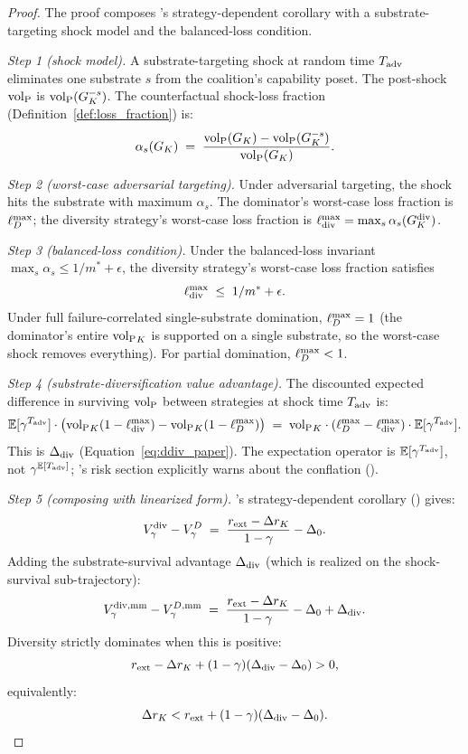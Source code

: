 \begin{proof}
The proof composes \citep[Horizon~Aware]{lasser2026horizon}'s strategy-dependent corollary with a
substrate-targeting shock model and the balanced-loss condition.

\emph{Step 1 (shock model).}  A substrate-targeting shock at random
time $T_{\mathrm{adv}}$ eliminates one substrate $s$ from the coalition's
capability poset. The post-shock ${\operatorname{vol}_{\mathrm{P}}}$ is ${\operatorname{vol}_{\mathrm{P}}}(G_K^{-s})$. The
counterfactual shock-loss fraction
(Definition~\ref{def:loss_fraction}) is:
\[
  \alpha_s(G_K) \;=\; \frac{{\operatorname{vol}_{\mathrm{P}}}(G_K) - {\operatorname{vol}_{\mathrm{P}}}(G_K^{-s})}{{\operatorname{vol}_{\mathrm{P}}}(G_K)}.
\]

\emph{Step 2 (worst-case adversarial targeting).}  Under
adversarial targeting, the shock hits the substrate with maximum
$\alpha_s$. The dominator's worst-case loss fraction is
$\ell_D^{\max}$; the diversity strategy's worst-case loss fraction is
$\ell_{\mathrm{div}}^{\max} = \max_s \alpha_s(G_K^{\mathrm{div}})$.

\emph{Step 3 (balanced-loss condition).}  Under the balanced-loss
invariant $\max_s \alpha_s \leq 1/m^* + \epsilon$, the diversity
strategy's worst-case loss fraction satisfies
\[
  \ell_{\mathrm{div}}^{\max} \;\leq\; 1/m^* + \epsilon.
\]
Under full failure-correlated single-substrate domination,
$\ell_D^{\max} = 1$ (the dominator's entire ${\operatorname{vol}_{\mathrm{P}}}_K$ is supported on a
single substrate, so the worst-case shock removes everything). For
partial domination, $\ell_D^{\max} < 1$.

\emph{Step 4 (substrate-diversification value advantage).}  The
discounted expected difference in surviving ${\operatorname{vol}_{\mathrm{P}}}$ between
strategies at shock time $T_{\mathrm{adv}}$ is:
\[
  \mathbb{E}[\gamma^{T_{\mathrm{adv}}}] \cdot
  \bigl({\operatorname{vol}_{\mathrm{P}}}_K(1 - \ell_{\mathrm{div}}^{\max}) - {\operatorname{vol}_{\mathrm{P}}}_K(1 - \ell_D^{\max})\bigr)
  \;=\; {\operatorname{vol}_{\mathrm{P}}}_K \cdot (\ell_D^{\max} - \ell_{\mathrm{div}}^{\max}) \cdot
  \mathbb{E}[\gamma^{T_{\mathrm{adv}}}].
\]
This is $\Delta_{\mathrm{div}}$ (Equation~\ref{eq:ddiv_paper}). The expectation
operator is $\mathbb{E}[\gamma^{T_{\mathrm{adv}}}]$, not
$\gamma^{\mathbb{E}[T_{\mathrm{adv}}]}$; \citep[Horizon~Aware]{lasser2026horizon}'s risk section explicitly
warns about the conflation
(\citep[Definition: Concentration Risk]{lasser2026horizon}).

\emph{Step 5 (composing with linearized form).}  \citep[Horizon~Aware]{lasser2026horizon}'s
strategy-dependent corollary
(\citep[Corollary: Strategy-Dependent Internal Rate]{lasser2026horizon}) gives:
\[
  V_{\gamma}^{\mathrm{div}} - V_{\gamma}^{D} \;=\;
  \frac{r_{\mathrm{ext}} - \Delta r_K}{1 - \gamma} - \Delta_0.
\]
Adding the substrate-survival advantage $\Delta_{\mathrm{div}}$ (which is realized
on the shock-survival sub-trajectory):
\[
  V_{\gamma}^{\mathrm{div,mm}} - V_{\gamma}^{D,\mathrm{mm}} \;=\;
  \frac{r_{\mathrm{ext}} - \Delta r_K}{1 - \gamma} - \Delta_0 + \Delta_{\mathrm{div}}.
\]
Diversity strictly dominates when this is positive:
\[
  r_{\mathrm{ext}} - \Delta r_K + (1-\gamma)(\Delta_{\mathrm{div}} - \Delta_0) > 0,
\]
equivalently:
\[
  \Delta r_K < r_{\mathrm{ext}} + (1-\gamma)(\Delta_{\mathrm{div}} - \Delta_0).
\]


\end{proof}
